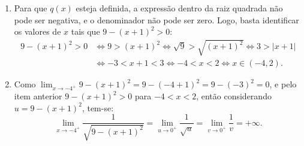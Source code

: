 \documentclass[12pt,a4paper]{article}
\begin{document}
\begin{ExerciseList}
\Answer \begin{enumerate}
\item Para que $q(x)$ esteja definida, a expressão dentro da raiz quadrada não pode ser negativa, e o denominador não pode ser zero. Logo, basta identificar os valores de $x$ tais que $9 - (x + 1)^2 > 0$:
\begin{align*}
9 - (x + 1)^2 > 0
& \Leftrightarrow  9 > (x + 1)^2
  \Leftrightarrow \sqrt{9} > \sqrt{(x + 1)^2}
  \Leftrightarrow  3 > |x + 1|\\
& \Leftrightarrow -3 < x + 1 < 3
  \Leftrightarrow -4 < x < 2
  \Leftrightarrow x \in (-4, 2).
\end{align*}
\item Como $\lim_{x\to -4^{+}} 9 - (x + 1)^2 = 9 - (-4 + 1)^2 = 9 - (-3)^2 = 0$, e pelo item anterior $9 - (x + 1)^2 > 0$ para $-4 < x < 2$, então considerando $u = 9 - (x + 1)^2$, tem-se:
\[
  \lim_{x\to -4^{+}} \dfrac{1}{\sqrt{9 - (x + 1)^2}}
= \lim_{u\to 0^{+}} \dfrac{1}{\sqrt{u}}
= \lim_{v\to 0^{+}} \dfrac{1}{v}
= +\infty.
\]


\end{enumerate}
\end{ExerciseList}
\end{document}
